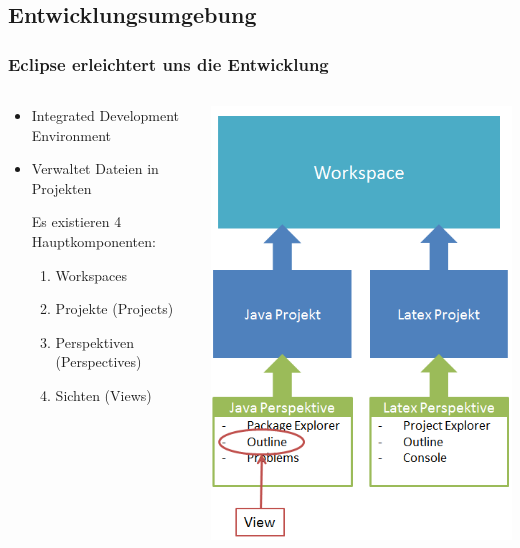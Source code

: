 \subsection{Entwicklungsumgebung}
\begin{frame} 
\frametitle{Eclipse erleichtert uns die Entwicklung}
	\begin{columns}
	    \begin{column}{.5\textwidth}
			\small
			\begin{itemize}
			  \item Integrated Development Environment
			  \item Verwaltet Dateien in Projekten
			  \begin{item}
			  		Es existieren 4 Hauptkomponenten:
					\begin{enumerate}
					  \item \tiny Workspaces
					  \item \tiny Projekte (Projects)
					  \item \tiny Perspektiven (Perspectives)
					  \item \tiny Sichten (Views)
					\end{enumerate}
			  \end{item} 
			\end{itemize}
			\normalsize
	    \end{column}
	    \begin{column}{.5\textwidth}
	   		\center
	    	\includegraphics[width=1\textwidth, keepaspectratio=true]{bilder/workspace.png}

\end{column}
\end{columns}
\end{frame}
